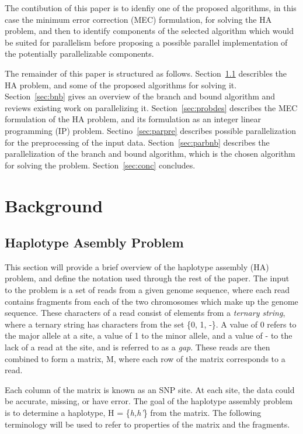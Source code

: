 \documentclass[10pt,twocolumn]{witseiepaper}
\begin{document}
The contibution of this paper is to idenfiy one of the proposed algorithms, in this case the minimum error
correction (MEC) formulation, for solving the HA problem, and then to identify components of the selected 
algorithm which would be suited for parallelism before proposing a possible parallel implementation of the 
potentially parallelizable components. 

The remainder of this paper is structured as follows. Section~\ref{sec:hap} describles the HA problem, and 
some of the proposed algorithms for solving it. Section~\ref{sec:bnb} gives an overview of the branch and
bound algorithm and reviews existing work on parallelizing it. Section~\ref{sec:probdes} describes the MEC
formulation of the HA problem, and its formulation as an integer linear programming (IP) problem.
Sectino~\ref{sec:parpre} describes possible parallelization for the preprocessing of the input data.
Section~\ref{sec:parbnb} describes the parallelization of the branch and bound algorithm, which is the chosen
algorithm for solving the problem. Section~\ref{sec:conc} concludes.


\section{Background} \label{sec:bground}

\subsection{Haplotype Asembly Problem} \label{sec:hap}

This section will provide a brief overview of the haplotype assembly (HA) problem, and define the
notation used through the rest of the paper. The input to the problem is a set of reads from a given genome
sequence, where each read contains fragments from each of the two chromosomes which make up the genome
sequence. These characters of a read consist of elements from a \textit{ternary string}, where a ternary
string has characters from the set \{0, 1, -\}. A value of 0 refers to the major allele
at a site, a value of 1 to the minor allele, and a value of - to the lack of a read at the site, and is
referred to as a \textit{gap}. These reads are then combined to form a matrix, M, where each row of the 
matrix corresponds to a read. 

Each column of the matrix is known as an SNP site. At each site, the data could be accurate, missing, or have
error. The goal of the haplotype assembly problem is to determine a haplotype, H = \{\textit{h,h'}\}
from the matrix. The following terminology will be used to refer to properties of the matrix and the
fragments. 
\end{document}
